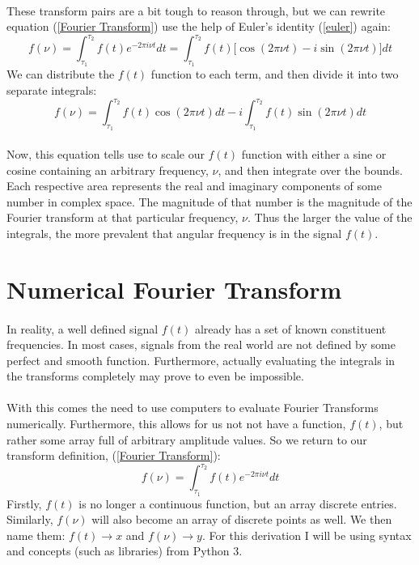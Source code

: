 \documentclass[12pt,letterpaper]{article}
\begin{document}
\paragraph*{}These transform pairs are a bit tough to reason through, but we can rewrite equation (\ref{Fourier Transform}) use the help of Euler's identity (\ref{euler}) again:
\begin{equation}
\label{Fourier Transform}
f(\nu) = 
\int_{\tau_1}^{\tau_2} f(t) e^{-2\pi i\nu t} dt =
\int_{\tau_1}^{\tau_2} f(t) \Big[\cos(2\pi\nu t) - i\sin(2\pi\nu t)\Big] dt
\end{equation}
We can distribute the $f(t)$ function to each term, and then divide it into two separate integrals:
\begin{equation}
f(\nu) = 
\int_{\tau_1}^{\tau_2} f(t)\cos(2\pi\nu t)dt -
i\int_{\tau_1}^{\tau_2} f(t)\sin(2\pi\nu t)dt
\end{equation}
\paragraph*{}Now, this equation tells use to scale our $f(t)$ function with either a sine or cosine containing an arbitrary frequency, $\nu$, and then integrate over the bounds. Each respective area represents the real and imaginary components of some number in complex space. The magnitude of that number is the magnitude of the Fourier transform at that particular frequency, $\nu$. Thus the larger the value of the integrals, the more prevalent that angular frequency is in the signal $f(t)$.


\section{Numerical Fourier Transform}
\paragraph*{}In reality, a well defined signal $f(t)$ already has a set of known 
constituent frequencies. In most cases, signals from the real world are not defined by some perfect and smooth function. Furthermore, actually evaluating the integrals in the transforms completely may prove to even be impossible. 
\paragraph*{}With this comes the need to use computers to evaluate Fourier Transforms numerically. Furthermore, this allows for us not not have a function, $f(t)$, but rather some array full of arbitrary amplitude values. So we return to our transform definition, (\ref{Fourier Transform}):
\begin{equation}
f(\nu) = \int_{\tau_1}^{\tau_2} f(t) e^{-2\pi i\nu t} dt
\end{equation}
Firstly, $f(t)$ is no longer a continuous function, but an array discrete entries. Similarly, $f(\nu)$ will also become an array of discrete points as well. We then name them: $f(t) \rightarrow x$ and $f(\nu) \rightarrow y$. For this derivation I will be using syntax and concepts (such as libraries) from Python 3. 
\end{document}
